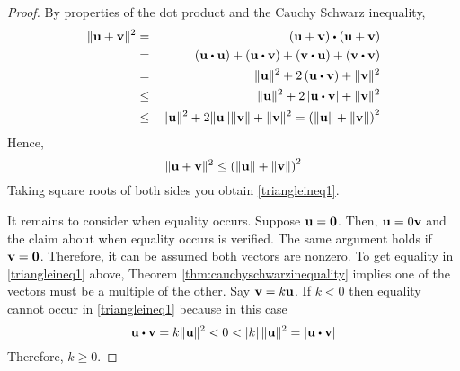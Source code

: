 \begin{proof} By properties of the dot product and the Cauchy Schwarz
inequality,
\begin{eqnarray*}
\vectlength \vect{u}+\vect{v}\vectlength ^{2} &=& \tup{\vect{u}+\vect{v}} \dotprod \tup{\vect{u}+\vect{v}} \\
& =&\tup{\vect{u}\dotprod \vect{u}} +\tup{\vect{u}\dotprod \vect{v}} +\tup{\vect{v}\dotprod \vect{u}} +\tup{\vect{v}\dotprod \vect{v}} \\
&=&\vectlength \vect{u}\vectlength ^{2}+2\tup{\vect{u}\dotprod \vect{v}}+\vectlength \vect{v}\vectlength ^{2} \\
&\leq& \vectlength \vect{u}\vectlength ^{2}+2\left\vert \vect{u}\dotprod \vect{v}\right\vert +\vectlength \vect{v}\vectlength ^{2} \\
&\leq& \vectlength \vect{u}\vectlength ^{2}+2\vectlength \vect{u}\vectlength \vectlength \vect{v}\vectlength +\vectlength \vect{v}\vectlength ^{2} =\tup{\vectlength \vect{u}\vectlength +\vectlength \vect{v}\vectlength} ^{2}
\end{eqnarray*}
Hence,
\begin{equation*}
\| {\bf u}+{\bf v}\| ^{2} \leq \left(\| {\bf u}\| +\| {\bf v}\|
\right) ^{2}
\end{equation*}
Taking square roots of both sides you obtain \ref{triangleineq1}.

It remains to consider when equality occurs. Suppose ${\bf u} = {\bf 0}$.
Then, ${\bf u} = 0 {\bf v}$ and the claim about when
equality occurs is verified. The same argument holds if ${\bf v} = {\bf 0}$. 
 Therefore, it can be assumed both vectors are
nonzero. To get equality in \ref{triangleineq1} above, Theorem \ref{thm:cauchyschwarzinequality} 
implies one of the vectors must be a multiple of
the other. Say ${\bf v}= k {\bf u}$. If $k <0$ then equality
cannot occur in \ref{triangleineq1} because in this case
\begin{equation*}
\vect{u}\dotprod \vect{v} =k \vectlength \vect{u}\vectlength
^{2}<0<\left| k \right| \vectlength \vect{u}\vectlength ^{2}=\left| \vect{u}\dotprod \vect{v}\right|
\end{equation*}
Therefore, $k \geq 0.$


\end{proof}
